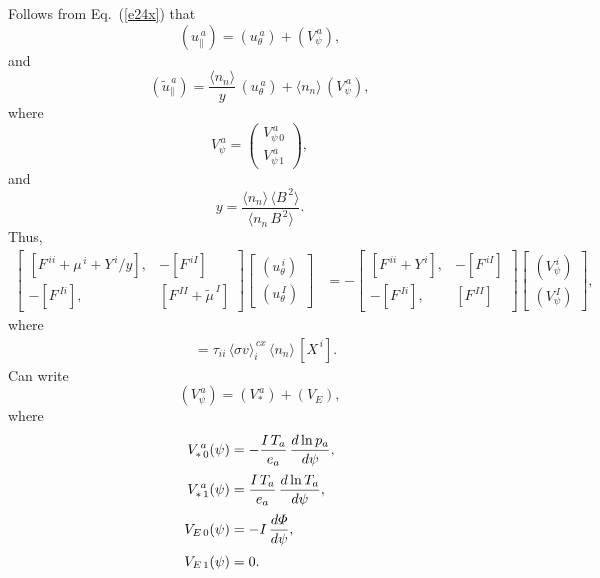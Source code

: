 \documentclass[notitlepage,12pt]{article}
\begin{document}
Follows from Eq.~(\ref{e24x}) that
\begin{equation}
 (u_{\parallel}^{\,a})  = (u_\theta^{\,a}) + (V_\psi^{\,a}),
\end{equation}
and
\begin{equation}
 (\tilde{u}_{\parallel}^{\,a})  = \frac{\langle n_n\rangle}{y}\,(u_\theta^{\,a}) + \langle n_n\rangle\,(V_\psi^{\,a}),
\end{equation}
where
\begin{equation}
V_\psi^{\,a} = \left(\begin{array}{c}V_{\psi\,0}^{\,a}\\[1ex]
V_{\psi\,1}^{\,a}\end{array}\right),
\end{equation}
and\
\begin{equation}
y = \frac{\langle n_n\rangle\,\langle B^{\,2}\rangle}{\langle n_n\,B^{\,2}\rangle}.
\end{equation}
Thus, 
\begin{align}\label{emode}
\left[\begin{array}{rr} [F^{\,ii}+\mu^{\,i}+Y^{\,i}/y], & -[F^{\,iI}]\\[0.5ex] -[F^{\,Ii}], & [F^{\,II}+\tilde{\mu}^{\,I}]\end{array}\right]
\left[\begin{array}{c}(u_\theta^{\,i}) \\[0.5ex] (u_\theta^{\,I})\end{array}\right]
&= -\left[\begin{array}{rr} [F^{\,ii}+Y^{\,i}], & -[F^{\,iI}]\\[0.5ex] -[F^{\,Ii}], & [F^{\,II}]\end{array}\right]
\left[\begin{array}{c} (V_\psi^{\,i})\\[0.5ex]
(V_\psi^{\,I})\end{array}\right],
\end{align}
where
\begin{align}
[Y^{\,i}] &= \tau_{ii}\,\langle\sigma v\rangle_i^{\,cx}\,\langle n_n\rangle \,[X^{\,i}].
\end{align}
Can write
\begin{equation}
(V_\psi^{\,a}) = (V_\ast^{\,a}) + (V_E),
\end{equation}
where
\begin{align}
V_{\ast\,0}^{\,a}(\psi) &=
- \frac{I\,T_a}{e_a}\,\frac{d \ln p_a}{d\psi},\\[0.5ex]
V_{\ast\,1}^{\,a}(\psi) &= \frac{I\,T_a}{e_a}\,\frac{d\ln T_a}{d\psi},\\[0.5ex]
V_{E\,0}(\psi) &=- I\,\frac{d{\mit\Phi}}{d\psi},\\[0.5ex]
V_{E\,1}(\psi) &= 0.
\end{align}
\end{document}
